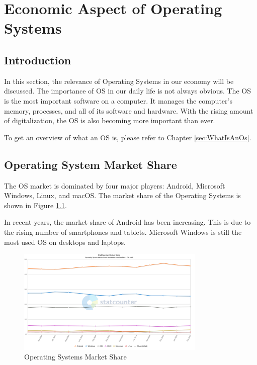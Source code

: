 \chapter{Economic Aspect of Operating Systems}
\label{chap:Economic_aspect_of_Operating_Systems}

\section{Introduction}

In this section, the relevance of Operating Systems in our economy will be discussed. The importance of OS in our daily life is not always obvious.
The OS is the most important software on a computer. It manages the computer's memory, processes, and all of its software and hardware. 
With the rising amount of digitalization, the OS is also becoming more important than ever.

To get an overview of what an OS is, please refer to Chapter \ref{sec:WhatIsAnOs}.

\section{Operating System Market Share}

The OS market is dominated by four major players: Android, Microsoft Windows, Linux, and macOS.
The market share of the Operating Systems is shown in Figure \ref{fig:Operating_Systems_Market_Share}. 

In recent years, the market share of Android has been increasing. This is due to the rising number of smartphones and tablets.
Microsoft Windows is still the most used OS on desktops and laptops.

\begin{figure}[H]
    \centering
    \includegraphics[width=0.8\textwidth]{figures/StatCounter-os_combined-ww-monthly-202402-202502.png}
    \caption{Operating Systems Market Share}
    \label{fig:Operating_Systems_Market_Share}
\end{figure}
\cite{OsMarketShare2}


